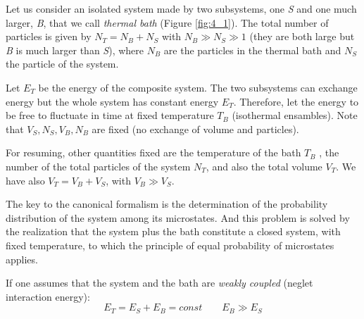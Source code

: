 \documentclass[../main/main.tex]{subfiles}
\begin{document}
Let us consider an isolated system made by two subsystems, one \emph{S} and one much larger, \emph{B}, that we call \emph{thermal bath} (Figure \ref{fig:4_1}). The total number of particles is given by \( N_T = N_B + N_S\)  with \( N_B \gg N_S \gg 1 \) (they are both large but \emph{B} is much larger than \emph{S}), where \( N_B \) are the particles in the thermal bath and \( N_S \) the particle of the system.

Let \( E_T \) be the energy of the composite system. The two subsystems can exchange energy but the whole system has constant energy  \( E_T \). Therefore, let the energy to be free to fluctuate in time at fixed temperature  \( T_B \) (isothermal ensambles).
Note that \( V_S,N_S,V_B,N_B \) are fixed (no exchange of volume and particles).

For resuming, other quantities fixed are the temperature of the bath \( T_B \) , the number of the total particles of the system \( N_T \), and also the total volume \( V_T \).
 We have also \( V_T = V_B + V_S \), with   \( V_B \gg V_S \).

The key to the canonical formalism is the determination of the probability distribution of the system among its microstates. And this problem is solved by the realization that the system plus the bath constitute a closed system, with fixed temperature, to which the principle of equal probability of microstates applies.

If one assumes that the system and the bath are \emph{weakly coupled} (neglet interaction energy):
\begin{equation*}
  E_T = E_S + E_B = const \qquad E_B \gg E_S
\end{equation*}
\end{document}
